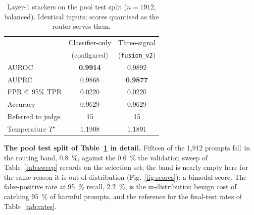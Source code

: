 \documentclass[journal]{IEEEtran}
\newcommand{\best}[1]{\textbf{#1}}
\begin{document}
\begin{table}[h]
\caption{Layer-1 stackers on the pool test split ($n=1912$, balanced). Identical
inputs; scores quantised as the router serves them.}
\label{tab:l1}
\centering
\footnotesize
\begin{tabular}{@{}lcc@{}}
\toprule
 & Classifier-only & Three-signal \\
 & (configured) & (\texttt{fusion\_v2}) \\
\midrule
AUROC              & \best{0.9914} & 0.9892 \\
AUPRC              & 0.9868 & \best{0.9877} \\
FPR @ 95\% TPR     & 0.0220 & 0.0220 \\
Accuracy           & 0.9629 & 0.9629 \\
Referred to judge  & 15 & 15 \\
Temperature $T^\star$ & 1.1908 & 1.1891 \\
\bottomrule
\end{tabular}
\end{table}

\noindent\textbf{The pool test split of Table~\ref{tab:l1} in detail.} Fifteen of the
1{,}912 prompts fall in the routing band, \SI{0.8}{\percent}, against the
\SI{0.6}{\percent} the validation sweep of Table~\ref{tab:sweep} records on the selection
set; the band is nearly empty here for the same reason it is out of
distribution (Fig.~\ref{fig:scores}): a bimodal score. The false-positive rate
at \SI{95}{\percent} recall, \SI{2.2}{\percent}, is the in-distribution benign
cost of catching \SI{95}{\percent} of harmful prompts, and the reference for
the final-test rates of Table~\ref{tab:rates}.
\end{document}
